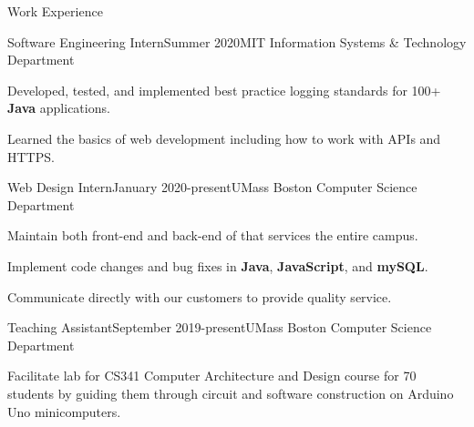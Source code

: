 \documentclass{resume} %
\begin{document}
\begin{Section}{Work Experience}
	
	\begin{Job}{Software Engineering Intern}{Summer 2020}{MIT Information Systems \& Technology Department}
			\item Developed, tested, and implemented best practice logging standards for 100+ \textbf{Java} applications.
			\item Learned the basics of web development including how to work with APIs and HTTPS.
	\end{Job}
	
	\begin{Job}{Web Design Intern}{January 2020-present}{UMass Boston Computer Science Department}
			\item Maintain both front-end and back-end of  that services the entire campus.
			\item Implement code changes and bug fixes in \textbf{Java}, \textbf{JavaScript}, and \textbf{mySQL}.
			\item Communicate directly with our customers to provide quality service.

	\end{Job}
	
	\begin{Job}{Teaching Assistant}{September 2019-present}{UMass Boston Computer Science Department}
			\item Facilitate lab for CS341 Computer Architecture and Design course for 70 students by guiding them through circuit and software construction on Arduino Uno minicomputers.
	\end{Job}
	
	

\end{Section}
\end{document}
